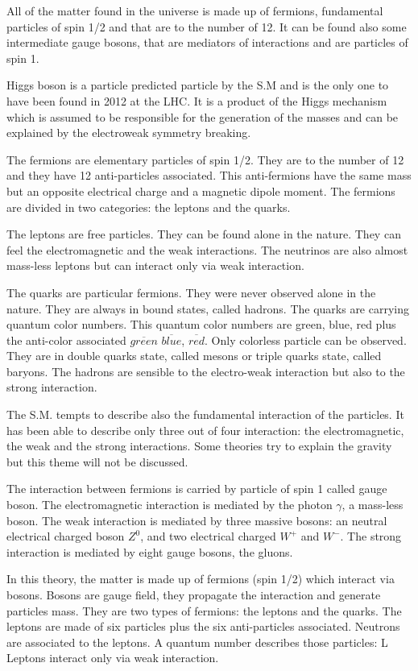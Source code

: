     All of the matter found in the universe is made up of fermions, fundamental particles of spin 1/2 and that are to the number of 12.
    It can be found also some intermediate gauge bosons, that are mediators of interactions and are particles of spin 1. 

    Higgs boson is a particle predicted particle by the S.M and is the only one to have been found in 2012 at the LHC. It is a product of the Higgs mechanism which is assumed to be responsible for the generation of the masses and can be explained by the electroweak symmetry breaking.
    
    The fermions are elementary particles of spin 1/2. They are to the number of 12 and they have 12 anti-particles associated.  This anti-fermions have the same mass but an opposite electrical charge and a magnetic dipole moment. The fermions are divided in two categories: the leptons and the quarks.
    
    The leptons are free particles. They can be found alone in the nature. They can feel the electromagnetic and the weak interactions. The neutrinos are also almost mass-less leptons but can interact only via weak interaction.
    
    The quarks are particular fermions. They were never observed alone in the nature. They are always in bound states, called hadrons. The quarks are carrying quantum color numbers. This quantum color numbers are green, blue, red plus the anti-color associated $\overline{green}$ $\overline{blue}$, $\overline{red}$. Only colorless particle can be observed. They are in double quarks state, called mesons or triple quarks state, called baryons. The hadrons are sensible to the electro-weak interaction but also to the strong interaction.
    
    The S.M. tempts to describe also the fundamental interaction of the particles. It has been able to describe only three out of four interaction: the electromagnetic, the weak and the strong interactions. Some theories try to explain the gravity but this theme will not be discussed.

	The interaction between fermions is carried by particle of spin 1 called gauge boson. The electromagnetic interaction is mediated by the photon $\gamma$, a mass-less boson.
    The weak interaction is mediated by three massive bosons: an neutral electrical charged boson $Z^0$, and two electrical charged $W^+$ and $W^-$.
    The strong interaction is mediated by eight gauge bosons, the gluons. 

    In this theory, the matter is made up of fermions (spin 1/2) which interact via bosons. 
    Bosons are gauge field, they propagate the interaction and generate particles mass.
    They are two types of fermions: the leptons and the quarks. 
    The leptons are made of six particles plus the  six anti-particles associated. 
    Neutrons are associated to the leptons.
    A quantum number describes those particles: L
    Leptons interact only via weak interaction.

